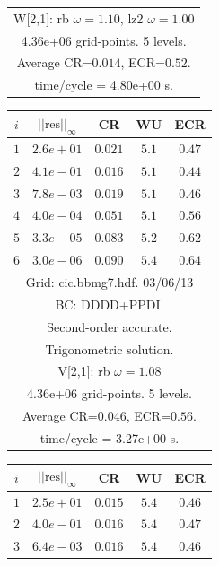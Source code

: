 \begin{table}[hbt]
\begin{center}
{\begin{tabular}{|c|c|c|c|c|}
\multicolumn{5}{|c|}{W[2,1]: rb $\omega=1.10$, lz2 $\omega=1.00$}  \\
\multicolumn{5}{|c|}{4.36e+06 grid-points. 5 levels.}  \\
\multicolumn{5}{|c|}{Average CR=$0.014$, ECR=$0.52$.}  \\
\multicolumn{5}{|c|}{time/cycle = 4.80e+00 s.}  \\
\hline 
\end{tabular}
\begin{tabular}{|c|c|c|c|c|} \hline 
 $i$   & $\vert\vert\mbox{res}\vert\vert_\infty$  &  CR     &  WU    & ECR  \\   \hline 
 $ 1$  & $ 2.6e+01$ & $0.021$ & $ 5.1$ & $0.47$ \\ 
 $ 2$  & $ 4.1e-01$ & $0.016$ & $ 5.1$ & $0.44$ \\ 
 $ 3$  & $ 7.8e-03$ & $0.019$ & $ 5.1$ & $0.46$ \\ 
 $ 4$  & $ 4.0e-04$ & $0.051$ & $ 5.1$ & $0.56$ \\ 
 $ 5$  & $ 3.3e-05$ & $0.083$ & $ 5.2$ & $0.62$ \\ 
 $ 6$  & $ 3.0e-06$ & $0.090$ & $ 5.4$ & $0.64$ \\ 
\hline 
\multicolumn{5}{|c|}{Grid: cic.bbmg7.hdf. 03/06/13}  \\
\multicolumn{5}{|c|}{BC: DDDD+PPDI.}  \\
\multicolumn{5}{|c|}{Second-order accurate.}  \\
\multicolumn{5}{|c|}{Trigonometric solution.}  \\
\multicolumn{5}{|c|}{V[2,1]: rb $\omega=1.08$}  \\
\multicolumn{5}{|c|}{4.36e+06 grid-points. 5 levels.}  \\
\multicolumn{5}{|c|}{Average CR=$0.046$, ECR=$0.56$.}  \\
\multicolumn{5}{|c|}{time/cycle = 3.27e+00 s.}  \\
\hline 
\end{tabular}
\begin{tabular}{|c|c|c|c|c|} \hline 
 $i$   & $\vert\vert\mbox{res}\vert\vert_\infty$  &  CR     &  WU    & ECR  \\   \hline 
 $ 1$  & $ 2.5e+01$ & $0.015$ & $ 5.4$ & $0.46$ \\ 
 $ 2$  & $ 4.0e-01$ & $0.016$ & $ 5.4$ & $0.47$ \\ 
 $ 3$  & $ 6.4e-03$ & $0.016$ & $ 5.4$ & $0.46$ \\ 

\end{tabular}}
\end{center}
\end{table}
